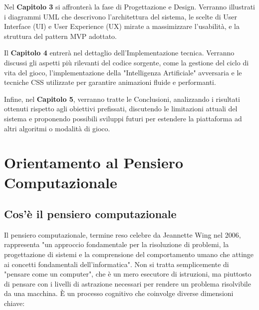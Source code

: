 \documentclass[openany]{theme/uniprthesis}
\begin{document}
Nel \textbf{Capitolo 3} si affronterà la fase di Progettazione e Design. Verranno illustrati i diagrammi UML che descrivono l'architettura del sistema, le scelte di User Interface (UI) e User Experience (UX) mirate a massimizzare l'usabilità, e la struttura del pattern MVP adottato.

Il \textbf{Capitolo 4} entrerà nel dettaglio dell'Implementazione tecnica. Verranno discussi gli aspetti più rilevanti del codice sorgente, come la gestione del ciclo di vita del gioco, l'implementazione della "Intelligenza Artificiale" avversaria e le tecniche CSS utilizzate per garantire animazioni fluide e performanti.

Infine, nel \textbf{Capitolo 5}, verranno tratte le Conclusioni, analizzando i risultati ottenuti rispetto agli obiettivi prefissati, discutendo le limitazioni attuali del sistema e proponendo possibili sviluppi futuri per estendere la piattaforma ad altri algoritmi o modalità di gioco.


\vspace*{\fill}
\newpage



\chapter{Orientamento al Pensiero Computazionale}

\section{Cos'è il pensiero computazionale}
Il pensiero computazionale, termine reso celebre da Jeannette Wing nel 2006, rappresenta "un approccio fondamentale per la risoluzione di problemi, la progettazione di sistemi e la comprensione del comportamento umano che attinge ai concetti fondamentali dell'informatica".
Non si tratta semplicemente di "pensare come un computer", che è un mero esecutore di istruzioni, ma piuttosto di pensare con i livelli di astrazione necessari per rendere un problema risolvibile da una macchina.
È un processo cognitivo che coinvolge diverse dimensioni chiave:
\end{document}
